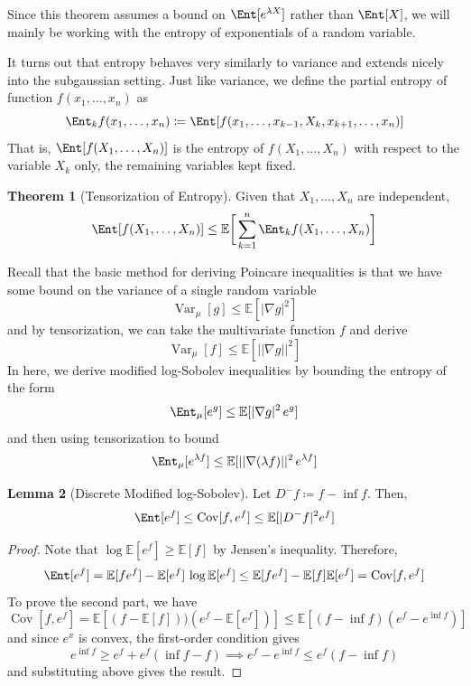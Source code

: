 \documentclass{article}
\DeclareMathOperator{\Cov}{Cov}
\DeclareMathOperator{\Var}{Var}
\theoremstyle{definition}
\newtheorem{theorem}{Theorem}[section]
\newtheorem{lemma}[theorem]{Lemma}
\theoremstyle{remark}
\theoremstyle{definition}
\begin{document}
  Since this theorem assumes a bound on $\Ent[e^{\lambda X}]$ rather than $\Ent[X]$, we will mainly be working with the entropy of exponentials of a random variable. 

  It turns out that entropy behaves very similarly to variance and extends nicely into the subgaussian setting. Just like variance, we define the partial entropy of function $f(x_1, \ldots, x_n)$ as 
  \[\Ent_k f (x_1, \ldots, x_n) \coloneqq \Ent[ f(x_1, \ldots, x_{k-1}, X_k , x_{k+1}, \ldots, x_n)]\]
  That is, $\Ent[f(X_1, \ldots, X_n)]$ is the entropy of $f(X_1, \ldots, X_n)$ with respect to the variable $X_k$ only, the remaining variables kept fixed. 

  \begin{theorem}[Tensorization of Entropy]
  Given that $X_1, \ldots, X_n$ are independent, 
  \[\Ent[ f(X_1, \ldots, X_n)] \leq \mathbb{E} \bigg[ \sum_{k=1}^n \Ent_k f (X_1, \ldots, X_n) \bigg]\]
  \end{theorem}

  Recall that the basic method for deriving Poincare inequalities is that we have some bound on the variance of a single random variable 
  \[\Var_\mu [g] \leq \mathbb{E}[|\nabla g|^2]\]
  and by tensorization, we can take the multivariate function $f$ and derive 
  \[\Var_\mu [f] \leq \mathbb{E}[ ||\nabla g||^2 ]\]
  In here, we derive modified log-Sobolev inequalities by bounding the entropy of the form 
  \[\Ent_\mu [e^g] \leq \mathbb{E}[ |\nabla g|^2 \, e^g ]\]
  and then using tensorization to bound 
  \[\Ent_\mu [e^{\lambda f}] \leq \mathbb{E} [ ||\nabla (\lambda f)||^2 \, e^{\lambda f} ]\]

  \begin{lemma}[Discrete Modified log-Sobolev]
  Let $D^- f \coloneqq f - \inf f$. Then, 
  \[\Ent[e^f] \leq \Cov[f, e^f] \leq \mathbb{E}[|D^- f|^2 e^f]\]
  \end{lemma}
  \begin{proof}
  Note that $\log \mathbb{E}[e^f] \geq \mathbb{E}[f]$ by Jensen's inequality. Therefore, 
  \[\Ent[e^f] = \mathbb{E}[f e^f] - \mathbb{E}[e^f] \, \log \mathbb{E}[e^f] \leq \mathbb{E}[f e^f] - \mathbb{E}[f] \mathbb{E}[e^f] = \Cov[f, e^f]\]
  To prove the second part, we have 
  \[\Cov[f, e^f] = \mathbb{E}[(f - \mathbb{E}[f]))(e^f - \mathbb{E}[e^f])] \leq \mathbb{E}[(f - \inf f)(e^f - e^{\inf f})] \]
  and since $e^x$ is convex, the first-order condition gives 
  \[e^{\inf f} \geq e^f + e^f (\inf f - f) \implies e^f - e^{\inf f} \leq e^f (f - \inf f)\]
  and substituting above gives the result. 
  \end{proof}
\end{document}
